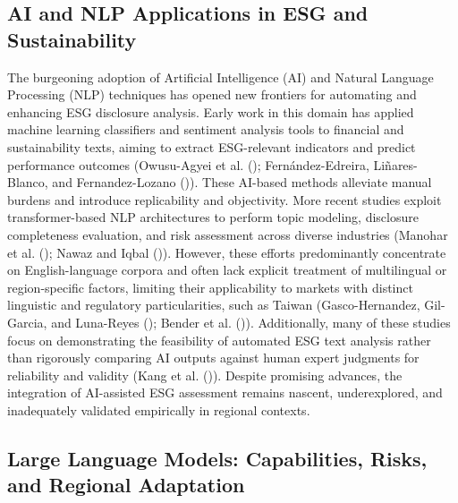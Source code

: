 \documentclass[
  12pt,
]{article}
\begin{document}
\subsection{AI and NLP Applications in ESG and
Sustainability}\label{ai-and-nlp-applications-in-esg-and-sustainability}

The burgeoning adoption of Artificial Intelligence (AI) and Natural
Language Processing (NLP) techniques has opened new frontiers for
automating and enhancing ESG disclosure analysis. Early work in this
domain has applied machine learning classifiers and sentiment analysis
tools to financial and sustainability texts, aiming to extract
ESG-relevant indicators and predict performance outcomes (Owusu-Agyei et
al. (); Fernández-Edreira,
Liñares-Blanco, and Fernandez-Lozano
()). These AI-based methods
alleviate manual burdens and introduce replicability and objectivity.
More recent studies exploit transformer-based NLP architectures to
perform topic modeling, disclosure completeness evaluation, and risk
assessment across diverse industries (Manohar et al.
(); Nawaz and Iqbal
()). However, these efforts predominantly
concentrate on English-language corpora and often lack explicit
treatment of multilingual or region-specific factors, limiting their
applicability to markets with distinct linguistic and regulatory
particularities, such as Taiwan (Gasco-Hernandez, Gil-Garcia, and
Luna-Reyes (); Bender et al.
()). Additionally, many of these studies
focus on demonstrating the feasibility of automated ESG text analysis
rather than rigorously comparing AI outputs against human expert
judgments for reliability and validity (Kang et al.
()). Despite promising advances, the
integration of AI-assisted ESG assessment remains nascent,
underexplored, and inadequately validated empirically in regional
contexts.

\subsection{Large Language Models: Capabilities, Risks, and Regional
Adaptation}\label{large-language-models-capabilities-risks-and-regional-adaptation}
\end{document}
